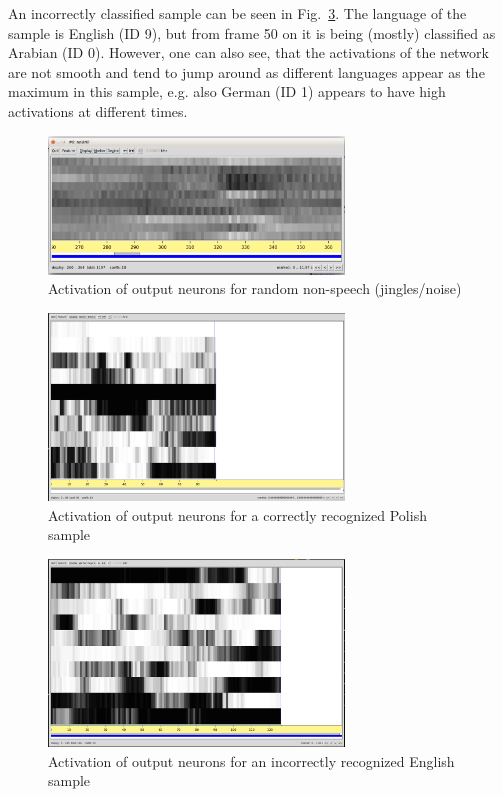An incorrectly classified sample can be seen in Fig.~\ref{fig:incorrect}. The language of the sample is English (ID 9), but from frame 50 on it is being (mostly) classified as Arabian (ID 0). However, one can also see, that the activations of the network are not smooth and tend to jump around as different languages appear as the maximum in this sample, e.g. also German (ID 1) appears to have high activations at different times. 

\begin{figure}[h!]
\caption{Activation of output neurons for random non-speech (jingles/noise)}
\label{fig:noise}
\centering
\includegraphics[width=0.7\textwidth]{images/noise.png}
\end{figure}

\begin{figure}[h!]
\caption{Activation of output neurons for a correctly recognized Polish sample}
\label{fig:polish}
\centering
\includegraphics[width=0.7\textwidth]{images/polishCorrect.png}
\end{figure}

\begin{figure}[h!!]
\caption{Activation of output neurons for an incorrectly recognized English sample}
\label{fig:incorrect}
\centering
\includegraphics[width=0.7\textwidth]{images/incorrect.png}
\end{figure}
\newpage

